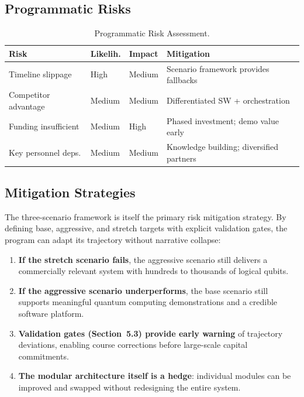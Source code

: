 \documentclass[conference]{IEEEtran}
\begin{document}
\subsection{Programmatic Risks}

\begin{table}[htbp]
\centering
\caption{Programmatic Risk Assessment.}
\label{tab:prog_risks}
\begin{tabular}{p{2cm}llp{2.3cm}}
\toprule
\textbf{Risk} & \textbf{Likelih.} & \textbf{Impact} & \textbf{Mitigation} \\
\midrule
Timeline slippage & High & Medium & Scenario framework provides fallbacks \\
Competitor advantage & Medium & Medium & Differentiated SW + orchestration \\
Funding insufficient & Medium & High & Phased investment; demo value early \\
Key personnel deps. & Medium & Medium & Knowledge building; diversified partners \\
\bottomrule
\end{tabular}
\end{table}

\subsection{Mitigation Strategies}

The three-scenario framework is itself the primary risk mitigation strategy. By defining base, aggressive, and stretch targets with explicit validation gates, the program can adapt its trajectory without narrative collapse:

\begin{enumerate}
\item \textbf{If the stretch scenario fails}, the aggressive scenario still delivers a commercially relevant system with hundreds to thousands of logical qubits.
\item \textbf{If the aggressive scenario underperforms}, the base scenario still supports meaningful quantum computing demonstrations and a credible software platform.
\item \textbf{Validation gates (Section~5.3) provide early warning} of trajectory deviations, enabling course corrections before large-scale capital commitments.
\item \textbf{The modular architecture itself is a hedge}: individual modules can be improved and swapped without redesigning the entire system.
\end{enumerate}
\end{document}
